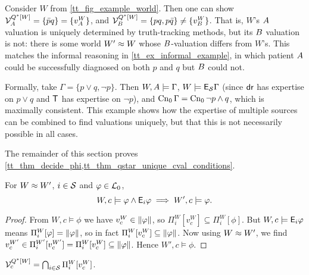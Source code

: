 \begin{example}
    \label{tt_ex_qstar_unique_cval_conditions}
    Consider $W$ from \cref{tt_fig_example_world}.
    Then one can show $\mathcal{V}^{Q^*[W]}_{A{}} = \{\bar{p}q\} =
    \{v^W_{A{}}\}$, and $\mathcal{V}^{Q^*[W]}_{B{}} = \{pq,
    p\bar{q}\} \ne \{v^W_{B{}}\}$. That is, $W$'s $A{}$
    valuation is uniquely determined by truth-tracking methods, but its
    $B{}$ valuation is not: there is some world $W' \approx W$ whose
    $B{}$-valuation differs from $W$'s. This matches the informal
    reasoning in \cref{tt_ex_informal_example}, in which patient $A{}$
    could be successfully diagnosed on both $p$ and $q$ but $B{}$ could
    not.

    Formally, take $\Gamma = \{p \lor q, \neg p\}$. Then $W, A{}
    \models \Gamma$, $W \models \mathsf{E}_{\mathcal{S}}{\Gamma}$ (since $\mathsf{dr}{}$ has
    expertise on $p \lor q$ and $\mathsf{T}{}$ has expertise on $\neg p$), and
    $\operatorname{Cn}_0{\Gamma} = \operatorname{Cn}_0{\neg p \land q}$, which is maximally consistent.
    This example shows how the expertise of multiple sources can be combined to
    find valuations uniquely, but that this is not necessarily possible in all
    cases.

\end{example}

The remainder of this section proves
\cref{tt_thm_decide_phi,tt_thm_qstar_unique_cval_conditions}.

\begin{lemma}
    \label{tt_lemma_phi_and_ephi}
    For $W \approx W'$, $i \in \mathcal{S}$ and $\varphi \in \mathcal{L}_0$,
    \[
        W, c \models \varphi \land \mathsf{E}_i\varphi \implies W', c \models \varphi.
    \]
\end{lemma}

\begin{proof}
    From $W, c \models \phi$ we have $v^W_c \in \|{\varphi}\|$, so
    $\Pi^W_i[v^W_c] \subseteq \Pi^W_i[\phi]$. But $W, c \models \mathsf{E}_i\varphi$ means
    $\Pi^W_i[\varphi] = \|{\varphi}\|$, so in fact $\Pi^W_i[v^W_c] \subseteq
    \|{\varphi}\|$. Now using $W \approx W'$, we find $v^{W'}_c \in
    \Pi^{W'}_i[v^{W'}_c] = \Pi^W_i[v^W_c] \subseteq \|{\varphi}\|$. Hence
    $W', c \models \phi$.
\end{proof}

\begin{lemma}
    \label{tt_lemma_vals_qstar_c}
    $\mathcal{V}^{Q^*[W]}_c = \bigcap_{i \in \mathcal{S}}{\Pi^W_i[v^W_c]}$.
\end{lemma}

